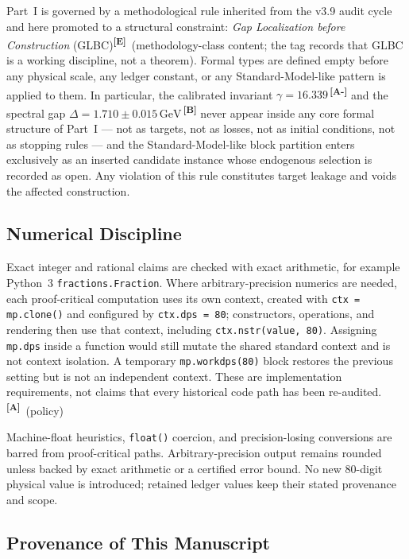 \documentclass[12pt,a4paper,twoside]{article}
\theoremstyle{plain}
\theoremstyle{definition}
\theoremstyle{remark}
\newcommand{\GeV}{\,\mathrm{GeV}}
\newcommand{\catmark}[1]{\textsuperscript{\textsf{\textbf{[#1]}}}}
\newcommand{\DeltaGap}{1.710 \pm 0.015\GeV} %
\newcommand{\GammaGeom}{16.339} %
\begin{document}
Part~I is governed by a methodological rule inherited from the v3.9 audit
cycle and here promoted to a structural constraint: \emph{Gap Localization
before Construction} (GLBC)\catmark{E}\ (methodology-class content; the
tag records that GLBC is a working discipline, not a theorem). Formal
types are defined empty before any physical scale, any ledger constant, or
any Standard-Model-like pattern is applied to them. In particular, the
calibrated invariant $\gamma = \GammaGeom$\,\catmark{A-} and the spectral
gap $\Delta = \DeltaGap$\,\catmark{B} never appear inside any core formal
structure of Part~I --- not as targets, not as losses, not as initial
conditions, not as stopping rules --- and the Standard-Model-like block
partition enters exclusively as an inserted candidate instance whose
endogenous selection is recorded as open. Any violation of this rule
constitutes target leakage and voids the affected construction.

\subsection{Numerical Discipline}
\label{subsec:numerical-discipline}

Exact integer and rational claims are checked with exact arithmetic, for
example Python~3 \texttt{fractions.Fraction}. Where arbitrary-precision
numerics are needed, each proof-critical computation uses its own context,
created with \texttt{ctx = mp.clone()} and configured by \texttt{ctx.dps = 80};
constructors, operations, and rendering then use that context, including
\texttt{ctx.nstr(value, 80)}. Assigning \texttt{mp.dps} inside a function would
still mutate the shared standard context and is not context isolation.
A temporary \texttt{mp.workdps(80)} block restores the previous setting but
is not an independent context. These are implementation requirements, not
claims that every historical code path has been re-audited.\catmark{A}\ (policy)

Machine-float heuristics, \texttt{float()} coercion, and precision-losing
conversions are barred from proof-critical paths. Arbitrary-precision output
remains rounded unless backed by exact arithmetic or a certified error bound.
No new 80-digit physical value is introduced; retained ledger values keep
their stated provenance and scope.

\subsection{Provenance of This Manuscript}
\label{subsec:provenance}
\end{document}
